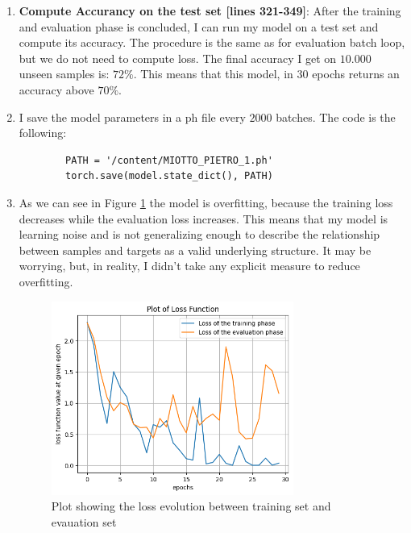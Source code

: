 \documentclass[a4paper]{article}
\begin{document}
\begin{enumerate}
	\item \textbf{Compute Accurancy on the test set [lines 321-349]}: After the training and evaluation phase is concluded, I can run my model on a test set and compute its accuracy. The procedure is the same as for evaluation batch loop, but we do not need to compute loss. The final accuracy I get on $10.000$ unseen samples is: $72\%$. This means that this model, in 30 epochs returns an accuracy above $70\%$. 
	\item I save the model parameters in a ph file every $2000$ batches. The code is the following:
    \begin{lstlisting}
        PATH = '/content/MIOTTO_PIETRO_1.ph'
        torch.save(model.state_dict(), PATH)
    \end{lstlisting}
    \item As we can see in Figure \ref{fig:lossplot} the model is overfitting, because the training loss decreases while the evaluation loss increases. This means that my model is learning noise and is not generalizing enough to describe the relationship between samples and targets as a valid underlying structure. It may be worrying, but, in reality, I didn't take any explicit measure to reduce overfitting. 

    \begin{figure}[h]
        \centering
        \includegraphics[width=0.75\textwidth]{images/Unknown-4.png}
        \caption{Plot showing the loss evolution between training set and evauation set}
        \label{fig:lossplot}
    \end{figure}


\end{enumerate}
\end{document}
